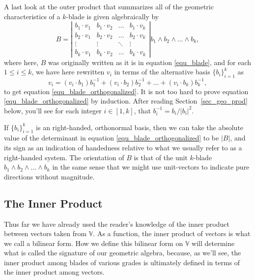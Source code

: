 \documentclass[12pt]{article}
\numberwithin{equation}{section}
\newcommand{\V}{\mathbb{V}}
\begin{document}
A last look at the outer product that summarizes all of the geometric characteristics of a $k$-blade
is given algebraically by
\begin{equation}\label{equ_blade_orthogonalized}
B = \left|\begin{array}{cccc}
b_1\cdot v_1 & b_1\cdot v_2 & \dots & b_1\cdot v_k \\
b_2\cdot v_1 & b_2\cdot v_2 & \dots & b_2\cdot v_k \\
\vdots & \vdots & \ddots & \vdots \\
b_k\cdot v_1 & b_k\cdot v_2 & \dots & b_k\cdot v_k
\end{array}\right|b_1\wedge b_2\wedge\dots\wedge b_k,
\end{equation}
where here, $B$ was originally written as it is in equation \eqref{equ_blade}, and
for each $1\leq i\leq k$, we have here rewritten $v_i$ in terms of the alternative basis $\{b_i\}_{i=1}^k$ as
\begin{equation*}
v_i = (v_i\cdot b_1)b_1^{-1}+(v_i\cdot b_2)b_2^{-1}+\dots+(v_i\cdot b_k)b_k^{-1},
\end{equation*}
to get equation \eqref{equ_blade_orthogonalized}.  It is not too hard to
prove equation \eqref{equ_blade_orthogonalized} by induction.
After reading Section~\ref{sec_geo_prod} below, you'll see
for each integer $i\in[1,k]$, that $b_i^{-1}=b_i/|b_i|^2$.

If $\{b_i\}_{i=1}^k$ is an right-handed, orthonormal basis,
then we can take the absolute value of the determinant in equation
\eqref{equ_blade_orthogonalized} to be $|B|$, and its sign as an
indication of handedness relative to what we usually refer to as a right-handed system.
The orientation of $B$ is that of the unit $k$-blade $b_1\wedge b_2\wedge\dots\wedge b_k$
in the same sense that we might use unit-vectors to indicate pure directions without magnitude.

\subsection{The Inner Product}

Thus far we have already used the reader's knowledge of the inner product
between vectors taken from $\V$.  As a function, the inner product of vectors is
what we call a bilinear form.  How we define this bilinear form on $\V$ will determine
what is called the signature of our geometric algebra, because, as we'll see,
the inner product among blades of various grades is ultimately defined
in terms of the inner product among vectors.
\end{document}

